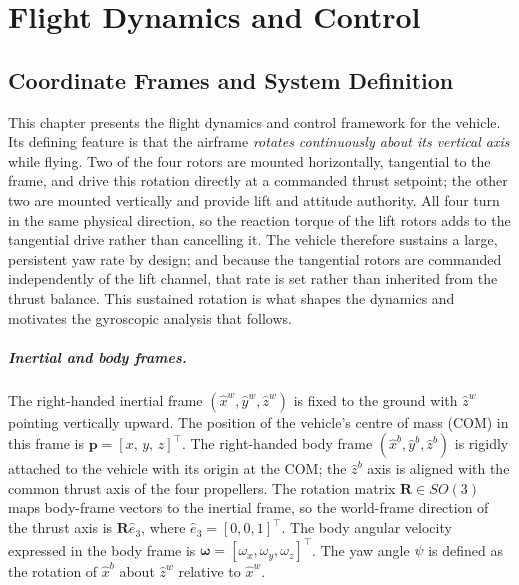 \chapter{Flight Dynamics and Control}
\label{chapter:papertwo}

\section{Coordinate Frames and System Definition}
\label{sec:coord_frames}

This chapter presents the flight dynamics and control framework for the
vehicle.  Its defining feature is that the airframe \emph{rotates continuously
about its vertical axis} while flying.  Two of the four rotors are mounted
horizontally, tangential to the frame, and drive this rotation directly at a
commanded thrust setpoint; the other two are mounted vertically and provide
lift and attitude authority.  All four turn in the same physical direction, so
the reaction torque of the lift rotors adds to the tangential drive rather than
cancelling it.  The vehicle therefore sustains a large, persistent yaw rate by design; and because the tangential rotors are commanded independently of the lift channel, that rate is set rather than inherited from the thrust balance.  This sustained rotation is what shapes the dynamics and motivates the
gyroscopic analysis that follows.

\paragraph{Inertial and body frames.}
The right-handed inertial frame $(\hat{x}^w, \hat{y}^w, \hat{z}^w)$ is
fixed to the ground with $\hat{z}^w$ pointing vertically upward.  The
position of the vehicle's centre of mass (COM) in this frame is
$\boldsymbol{p} = [x,\,y,\,z]^{\top}$.  The right-handed body frame
$(\hat{x}^b, \hat{y}^b, \hat{z}^b)$ is rigidly attached to the vehicle with
its origin at the COM; the $\hat{z}^b$ axis is aligned with the common
thrust axis of the four propellers.  The rotation matrix
$\boldsymbol{R}\in SO(3)$ maps body-frame vectors to the inertial frame,
so the world-frame direction of the thrust axis is $\boldsymbol{R}\hat{e}_3$,
where $\hat{e}_3 = [0,0,1]^{\top}$.  The body angular velocity expressed in
the body frame is $\boldsymbol{\omega} = [\omega_x, \omega_y, \omega_z]^{\top}$.
The yaw angle $\psi$ is defined as the rotation of $\hat{x}^b$ about
$\hat{z}^w$ relative to $\hat{x}^w$.

